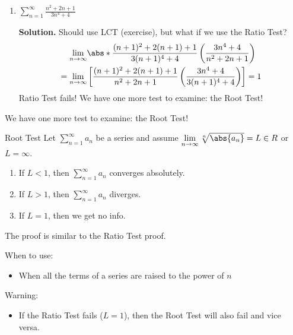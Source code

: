 \begin{Example}{}{}
\begin{enumerate}[label=(\roman*)]
              \textbf{Solution.} ``Almost geometric,'' Ratio Test:
              \[ \lim\limits_{{n} \to {\infty}}
                  \abs*{\frac{(n+1)^2+3(n+1)}{5^{n+1}}
                      \left( \frac{5^n}{n^2+3n} \right)}
                  =\lim\limits_{{n} \to {\infty}} \frac{1}{5} \left( \frac{n^2+2n+1+3n+3}{n^2+3n} \right)
                  =\frac{1}{5}
                  <1 \]
              So, the series \emph{converges absolutely}.
        \item $ \displaystyle \sum\limits_{n=1}^{\infty} \frac{n^2+2n+1}{3n^4+4} $

              \textbf{Solution.} Should use LCT (exercise), but what if we use the Ratio Test?
              \begin{align*}
                  \lim\limits_{{n} \to {\infty}}  &
                  \abs*{\frac{(n+1)^2+2(n+1)+1}{3(n+1)^4+4}
                  \left( \frac{3n^4+4}{n^2+2n+1} \right)}                                    \\
                  =\lim\limits_{{n} \to {\infty}} & \left[ \frac{(n+1)^2+2(n+1)+1}{n^2+2n+1}
                      \left( \frac{3n^4+4}{3(n+1)^4+4} \right)  \right] =1
              \end{align*}
              Ratio Test fails! We have one more test to examine: the Root Test!
    \end{enumerate}
\end{Example}

We have one more test to examine: the Root Test!

\begin{Theorem}{Root Test}{}
    Let $ \sum\limits_{n=1}^{\infty} a_n $ be a series and assume $ \lim\limits_{{n} \to {\infty}}
        \sqrt[n]{\abs{a_n}}=L\in\mathbb{R} $ or $ L=\infty $.
    \begin{enumerate}[label=(\arabic*)]
        \item If $ L<1 $, then $ \sum\limits_{n=1}^{\infty} a_n $ converges absolutely.
        \item If $ L>1 $, then $ \sum\limits_{n=1}^{\infty} a_n $ diverges.
        \item If $ L=1 $, then we get no info.
    \end{enumerate}
\end{Theorem}
The proof is similar to the Ratio Test proof.

\begin{Remark}{}{}
    When to use:
    \begin{itemize}
        \item When all the terms of a series are raised to the power of $ n $
    \end{itemize}
    Warning:
    \begin{itemize}
        \item If the Ratio Test fails ($ L=1 $), then the Root Test will also fail
              and vice versa.
    \end{itemize}
\end{Remark}

